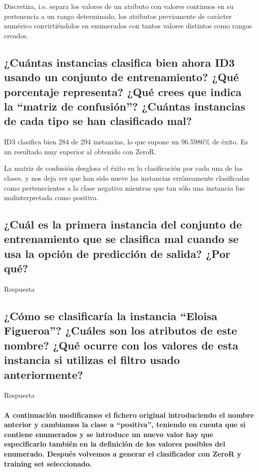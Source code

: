 \documentclass[12pt]{article}
\begin{document}
Discretiza, i.e. separa los valores de un atributo con valores continuos en su
pertenencia a un rango determinado, los atributos previamente de carácter
numérico convirtiéndolos en enumerados con tantos valores distintos como rangos
creados.

\subsection*{\small ¿Cuántas instancias clasifica bien ahora ID3 usando un
conjunto de entrenamiento? ¿Qué porcentaje representa? ¿Qué crees que indica
la ``matriz de confusión''? ¿Cuántas instancias de cada tipo se han clasificado
mal?}

ID3 clasifica bien 284 de 294 instancias, lo que supone un 96.5986\% de éxito.
Es un resultado muy superior al obtenido con ZeroR.

La matriz de confusión desglosa el éxito en la clasificación por cada una de
las clases, y nos deja ver que han sido nueve las instancias erróneamente
clasificadas como pertenecientes a la clase negativa mientras que tan sólo una
instancia fue malinterpretada como positiva.

\subsection*{\small ¿Cuál es la primera instancia del conjunto de entrenamiento
que se clasifica mal cuando se usa la opción de predicción de salida? ¿Por qué?}

Respuesta

\subsection*{\small ¿Cómo se clasificaría la instancia ``Eloisa Figueroa''?
¿Cuáles son los atributos de este nombre? ¿Qué ocurre con los valores de esta
instancia si utilizas el filtro usado anteriormente?}

Respuesta

\paragraph{\small A continuación modificamos el fichero original introduciendo
el nombre anterior y cambiamos la clase a ``positiva'', teniendo en cuenta que
si contiene enumerados y se introduce un nuevo valor hay que especificarlo
también en la definición de los valores posibles del enumerado. Después
volvemos a generar el clasificador con ZeroR y training set seleccionado.}
\end{document}
